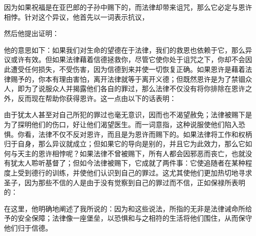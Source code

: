 因为如果祝福是在亚巴郎的子孙中赐下的，而法律却带来诅咒，那么它必定与恩许相悖。针对这个异议，他首先以一词表示抗议，\par

 \par

然后他提出证明：\par

 \par

他的意思如下：如果我们对生命的望德在于法律，我们的救恩也依赖于它，那么异议或许有效。但如果法律藉着信德拯救你，尽管它使你处于诅咒之下，你却不会因此遭受任何损失，不受伤害，因为信德到来并使一切恢复正确。如果恩许是藉着法律赐予的，你本有理由害怕，离开法律就等于离开义德；但既然恩许是为了禁锢众人，即为了说服众人并揭露他们各自的罪过，那么法律不仅没有将你排除在恩许之外，反而现在帮助你获得恩许。这一点由以下的话表明：\par

 \par

由于犹太人甚至对自己所犯的罪过也毫无意识，因而也不渴望赦免；法律被赐下是为了探明他们的伤口，好让他们渴望医生。而一词意指，这种说服使他们陷入恐惧。你看，法律不仅不反对恩许，而且是为恩许而赐下的。如果法律将工作和权柄归于自身，那么异议就成立；但如果它的导向是别的，并且它为此效力，那么它如何与天主的恩许相悖呢？如果法律不曾被赐下，所有人都会因邪恶而丧亡，也就没有犹太人聆听基督了；但如今法律被赐下，它成就了两件事：它使追随者在某种程度上受到德行的训练，并使他们认识到自己的罪过。这尤其使他们更加热切地寻求圣子，因为那些不信的人是由于没有觉察到自己的罪过而不信，正如保禄所表明的： \par

 \par

在这里，他明确地阐述了我所说的：因为和这些说法，所指的无非是法律诫命所给予的安全保障；法律像一座堡垒，以恐惧和与之相符的生活将他们围住，从而保守他们归于信德。\par

 \par

